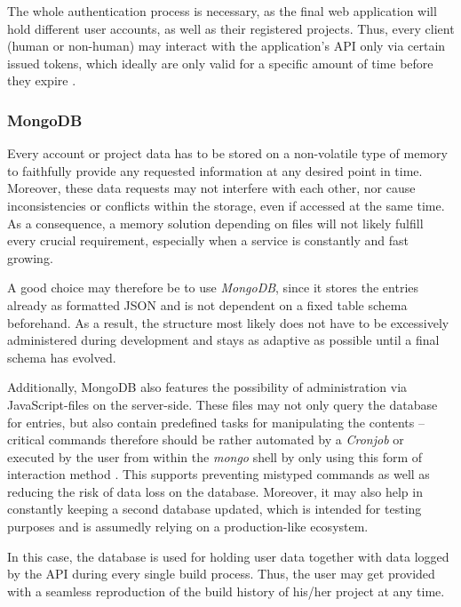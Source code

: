 The whole authentication process is necessary, as the final web application will hold different user accounts, as well as their registered projects. Thus, every client (human or non-human) may interact with the application's API only via certain issued tokens, which ideally are only valid for a specific amount of time before they expire \cite[43]{hardt2012oauth}.

\subsubsection{MongoDB}
Every account or project data has to be stored on a non-volatile type of memory to faithfully provide any requested information at any desired point in time. Moreover, these data requests may not interfere with each other, nor cause inconsistencies or conflicts within the storage, even if accessed at the same time. As a consequence, a memory solution depending on files will not likely fulfill every crucial requirement, especially when a service is constantly and fast growing.

A good choice may therefore be to use \emph{MongoDB}, since it stores the entries already as formatted JSON and is not dependent on a fixed table schema beforehand. As a result, the structure most likely does not have to be excessively administered during development and stays as adaptive as possible until a final schema has evolved.

Additionally, MongoDB also features the possibility of administration via
JavaScript-files on the server-side. These files may not only query the database for entries, but also contain predefined tasks for manipulating the contents -- critical commands therefore should be rather automated by a \emph{Cronjob} or executed by the user from within the \emph{mongo} shell by only using this form of interaction method \cite{MongoDBWritingScripts}. This supports preventing mistyped commands as well as reducing the risk of data loss on the database. Moreover, it may also help in constantly keeping a second database updated, which is intended for testing purposes and is assumedly relying on a production-like ecosystem.

In this case, the database is used for holding user data together with data logged by the API during every single build process. Thus, the user may get provided with a seamless reproduction of the build history of his/her project at any time.
